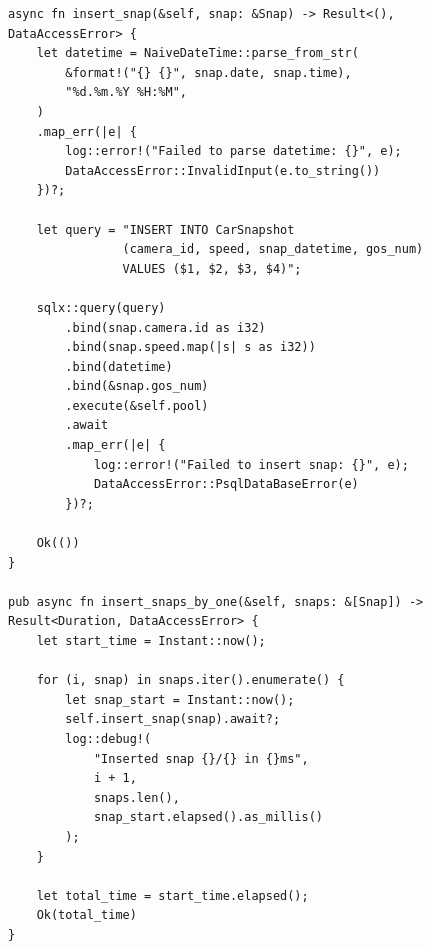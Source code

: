 \begin{center}
\captionsetup{justification=raggedright,singlelinecheck=off}
\begin{lstlisting}[label=lst:ins_by_one, caption=Постепенная вставка]
async fn insert_snap(&self, snap: &Snap) -> Result<(), DataAccessError> {
    let datetime = NaiveDateTime::parse_from_str(
        &format!("{} {}", snap.date, snap.time),
        "%d.%m.%Y %H:%M",
    )
    .map_err(|e| {
        log::error!("Failed to parse datetime: {}", e);
        DataAccessError::InvalidInput(e.to_string())
    })?;

    let query = "INSERT INTO CarSnapshot 
                (camera_id, speed, snap_datetime, gos_num) 
                VALUES ($1, $2, $3, $4)";

    sqlx::query(query)
        .bind(snap.camera.id as i32)
        .bind(snap.speed.map(|s| s as i32))
        .bind(datetime)
        .bind(&snap.gos_num)
        .execute(&self.pool)
        .await
        .map_err(|e| {
            log::error!("Failed to insert snap: {}", e);
            DataAccessError::PsqlDataBaseError(e)
        })?;
    
    Ok(())
}

pub async fn insert_snaps_by_one(&self, snaps: &[Snap]) -> Result<Duration, DataAccessError> {
    let start_time = Instant::now();

    for (i, snap) in snaps.iter().enumerate() {
        let snap_start = Instant::now();
        self.insert_snap(snap).await?;
        log::debug!(
            "Inserted snap {}/{} in {}ms",
            i + 1,
            snaps.len(),
            snap_start.elapsed().as_millis()
        );
    }

    let total_time = start_time.elapsed();
    Ok(total_time)
}
\end{lstlisting}
\end{center}

